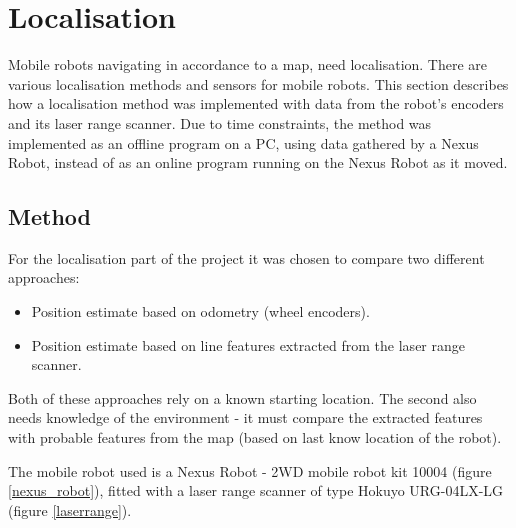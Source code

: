 \section{Localisation}
Mobile robots navigating in accordance to a map, need localisation.
There are various localisation methods and sensors for mobile robots.
This section describes how a localisation method was implemented %
with data from the robot's encoders and its laser range scanner.
Due to time constraints, the method was implemented as an offline program
on a PC, using data gathered by a Nexus Robot, instead of as an online program
running on the Nexus Robot as it moved.
\subsection{Method}
For the localisation part of the project it was chosen to compare two different approaches:

\begin{itemize}
	\item Position estimate based on odometry (wheel encoders).
	\item Position estimate based on line features extracted from the laser range scanner. 
\end{itemize}

Both of these approaches rely on a known starting location.
The second also needs knowledge of the environment
 - it must  compare the extracted features with probable features from the map
(based on last know location of the robot). 


The mobile robot used is a Nexus Robot - 2WD mobile robot kit 10004 (figure \ref{nexus_robot}),
fitted with a laser range scanner of type Hokuyo URG-04LX-LG (figure \ref{laserrange}). 

